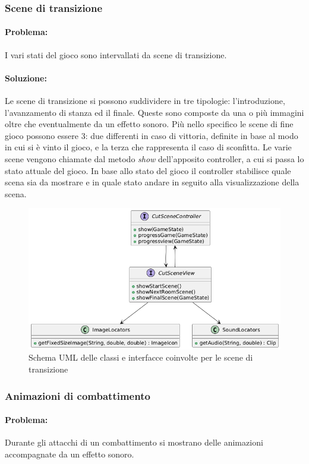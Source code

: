 \documentclass[a4paper,12pt]{report}
\begin{document}
\subsubsection{Scene di transizione}
\paragraph{Problema:} I vari stati del gioco sono intervallati da scene di transizione. 
\paragraph{Soluzione:} Le scene di transizione si possono suddividere in tre tipologie: l'introduzione, l'avanzamento di stanza ed il finale. Queste sono composte da una o più
immagini oltre che eventualmente da un effetto sonoro. Più nello specifico le scene di fine gioco possono essere 3: due differenti in caso di vittoria, definite in base al modo in cui 
si è vinto il gioco, e la terza che rappresenta il caso di sconfitta.
Le varie scene vengono chiamate dal metodo \textit{show} dell'apposito controller, a cui si passa lo stato attuale del gioco. In base allo stato del gioco il controller stabilisce
quale scena sia da mostrare e in quale stato andare in seguito alla visualizzazione della scena. 
\begin{figure}[H]
	\centering{}
	\includegraphics[width=\textwidth]{img/lorenzo/cutscene.png}
	\caption{Schema UML delle classi e interfacce coinvolte per le scene di transizione}
	\label{img:template}
\end{figure}

\subsubsection{Animazioni di combattimento}
\paragraph{Problema:} Durante gli attacchi di un combattimento si mostrano delle animazioni accompagnate da un effetto sonoro.
\end{document}
